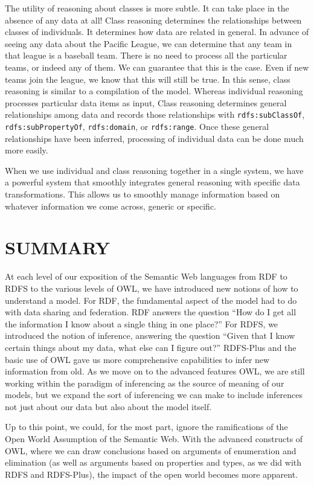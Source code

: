 The utility of reasoning about classes is more subtle. It can take place
in the absence of any data at all! Class reasoning determines the
relationships between classes of individuals. It determines how data are
related in general. In advance of seeing any data about the Pacific
League, we can determine that any team in that league is a baseball
team. There is no need to process all the particular teams, or indeed
any of them. We can guarantee that this is the case. Even if new teams
join the league, we know that this will still be true. In this sense,
class reasoning is similar to a compilation of the model. Whereas
individual reasoning processes particular data items as input, Class
reasoning determines general relationships among data and records those
relationships with \texttt{rdfs:subClassOf}, \texttt{rdfs:subPropertyOf}, \texttt{rdfs:domain}, or
\texttt{rdfs:range}. Once these general relationships have been inferred,
processing of individual data can be done much more easily.

When we use individual and class reasoning together in a single system,
we have a powerful system that smoothly integrates general reasoning
with specific data transformations. This allows us to smoothly manage
information based on whatever information we come across, generic or
specific.

\section{SUMMARY}

At each level of our exposition of the Semantic Web languages from RDF
to RDFS to the various levels of OWL, we have introduced new notions of
how to understand a model. For RDF, the fundamental aspect of the model
had to do with data sharing and federation. RDF answers the question
``How do I get all the information I know about a single thing in one
place?'' For RDFS, we introduced the notion of inference, answering the
question ``Given that I know certain things about my data, what else can
I figure out?'' RDFS-Plus and the basic use of OWL gave us more
comprehensive capabilities to infer new information from old. As we move
on to the advanced features OWL, we are still working within the
paradigm of inferencing as the source of meaning of our models, but we
expand the sort of inferencing we can make to include inferences not
just about our data but also about the model itself.

Up to this point, we could, for the most part, ignore the ramifications
of the Open World Assumption of the Semantic Web. With the advanced
constructs of OWL, where we can draw conclusions based on arguments of
enumeration and elimination (as well as arguments based on properties
and types, as we did with RDFS and RDFS-Plus), the impact of the open
world becomes more apparent.

